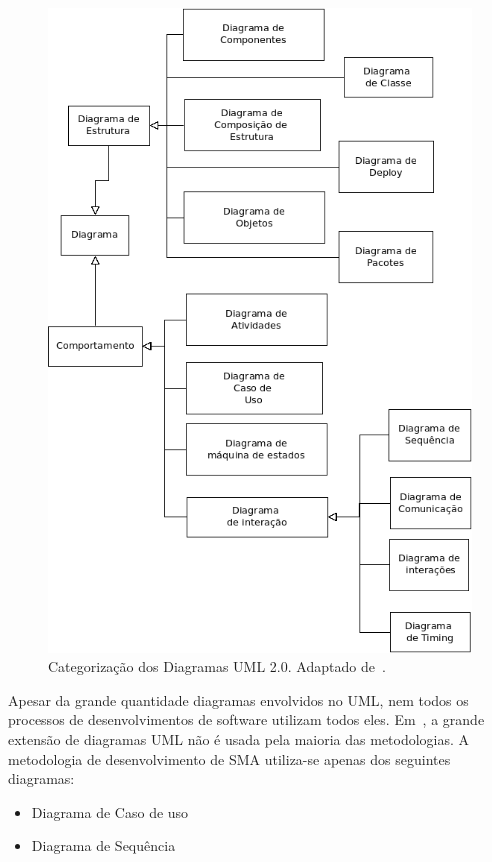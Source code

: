 \begin{figure}
	\centering
	\includegraphics[scale=0.75]{images/categorias-diagramas.png}
	\caption{Categorização dos Diagramas UML 2.0. Adaptado de~\cite{fowler04}.}
	\label{fig:categorias-diagramas}
\end{figure}

Apesar da grande quantidade diagramas envolvidos no UML, nem todos os processos de desenvolvimentos de software utilizam todos eles. Em~\cite{larman08}, a grande extensão de diagramas UML não é usada pela maioria das metodologias. A metodologia de desenvolvimento de SMA utiliza-se apenas dos seguintes diagramas:

\begin{itemize}
	\item Diagrama de Caso de uso
	\item Diagrama de Sequência
\end{itemize}

